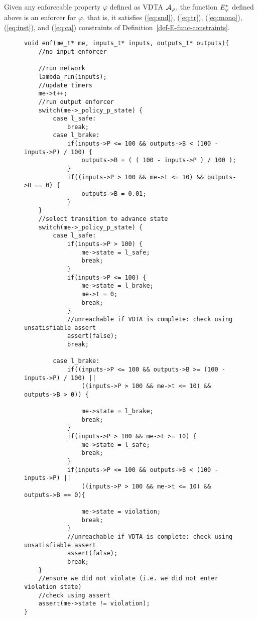 \begin{prop}
	\label{prop-constraints-algo}
	Given any enforceable property $\varphi$ defined as VDTA ${\mathcal A}_\varphi$,
	the function ${E_{\varphi}^*}$ defined above is an enforcer for $\varphi$, that is,
	it satisfies (\ref{eq:snd}), (\ref{eq:tr}), (\ref{eq:mono}), (\ref{eq:inst}), and (\ref{eq:ca}) constraints of Definition~\ref{def-E-func-constraints}.
\end{prop}


\begin{figure}[H]
	\vspace{-5mm}
	\begin{lstlisting}[caption={Example compiled enforcer for VDTA in Figure~\ref{fig:vdta-car-rte}},label={lst:example}]
void enf(me_t* me, inputs_t* inputs, outputs_t* outputs){
	//no input enforcer
	
	//run network
	lambda_run(inputs);	
	//update timers
	me->t++;	
	//run output enforcer
	switch(me->_policy_p_state) {
		case l_safe:
			break;
		case l_brake:
			if(inputs->P <= 100 && outputs->B < (100 - inputs->P) / 100) {
				outputs->B = ( ( 100 - inputs->P ) / 100 );
			} 
			if((inputs->P > 100 && me->t <= 10) && outputs->B == 0) {
				outputs->B = 0.01;
			}	
	}
	//select transition to advance state
	switch(me->_policy_p_state) {
		case l_safe:
			if(inputs->P > 100) {
				me->state = l_safe;
				break;
			} 
			if(inputs->P <= 100) {
				me->state = l_brake;
				me->t = 0;
				break;
			} 
			//unreachable if VDTA is complete: check using unsatisfiable assert
			assert(false);
			break;
	
		case l_brake:
			if((inputs->P <= 100 && outputs->B >= (100 - inputs->P) / 100) || 
				((inputs->P > 100 && me->t <= 10) && outputs->B > 0)) {
				
				me->state = l_brake;
				break;
			} 
			if(inputs->P > 100 && me->t >= 10) {
				me->state = l_safe;
				break;
			} 
			if(inputs->P <= 100 && outputs->B < (100 - inputs->P) || 
				((inputs->P > 100 && me->t <= 10) && outputs->B == 0){
				
				me->state = violation;
				break;
			} 
			//unreachable if VDTA is complete: check using unsatisfiable assert
			assert(false);
			break;
	}
	//ensure we did not violate (i.e. we did not enter violation state)
	//check using assert
	assert(me->state != violation);
}\end{lstlisting}
	\vspace{-5mm}
\end{figure}

